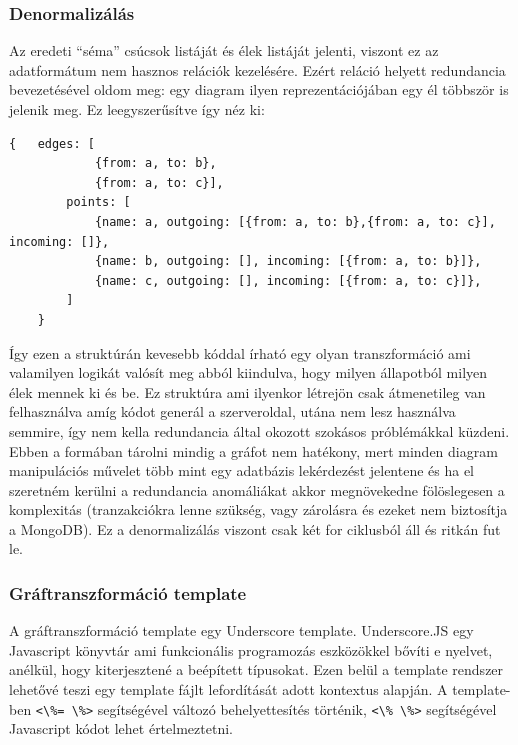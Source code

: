 \subsubsection{Denormalizálás}

Az eredeti ``séma'' csúcsok listáját és élek listáját jelenti, viszont ez az adatformátum nem hasznos relációk kezelésére. Ezért reláció helyett redundancia bevezetésével oldom meg: egy diagram ilyen reprezentációjában egy él többször is jelenik meg. Ez leegyszerűsítve így néz ki:

\begin{lstlisting}[caption=Denormalizált -- vagy redundáns -- séma]
    {   edges: [
            {from: a, to: b},
            {from: a, to: c}],
        points: [
            {name: a, outgoing: [{from: a, to: b},{from: a, to: c}], incoming: []},
            {name: b, outgoing: [], incoming: [{from: a, to: b}]},
            {name: c, outgoing: [], incoming: [{from: a, to: c}]},
        ]
    }
\end{lstlisting}

Így ezen a struktúrán kevesebb kóddal írható egy olyan transzformáció ami valamilyen logikát valósít meg abból kiindulva, hogy milyen állapotból milyen élek mennek ki és be. Ez struktúra ami ilyenkor létrejön csak átmenetileg van felhasználva amíg kódot generál a szerveroldal, utána nem lesz használva semmire, így nem kella redundancia által okozott szokásos próblémákkal küzdeni. Ebben a formában tárolni mindig a gráfot nem hatékony, mert minden diagram manipulációs művelet több mint egy adatbázis lekérdezést jelentene és ha el szeretném kerülni a redundancia anomáliákat 
akkor megnövekedne fölöslegesen a komplexitás (tranzakciókra lenne szükség, vagy zárolásra és ezeket nem biztosítja a MongoDB). Ez a denormalizálás viszont csak két for ciklusból áll és ritkán fut le. 

\subsubsection{Gráftranszformáció template}

A gráftranszformáció template egy Underscore template. Underscore.JS egy Javascript könyvtár ami funkcionális programozás eszközökkel bővíti e nyelvet, anélkül, hogy kiterjesztené a beépített típusokat. \cite{underscorejs.org}
Ezen belül a template rendszer lehetővé teszi egy template fájlt lefordítását adott kontextus alapján. A template-ben \lstinline{<\%= \%>} segítségével változó behelyettesítés történik, \lstinline{<\% \%>} segítségével Javascript kódot lehet értelmeztetni. 

